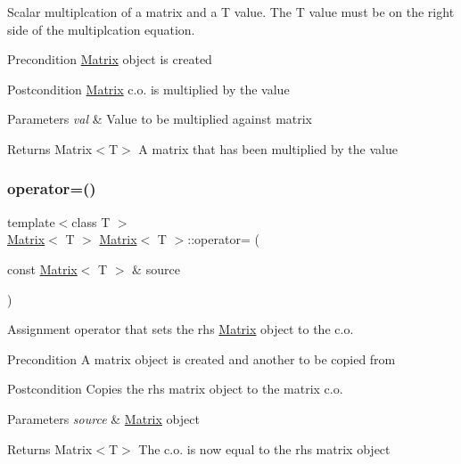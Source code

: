 Scalar multiplcation of a matrix and a T value. The T value must be on the right side of the multiplcation equation. 

\begin{DoxyPrecond}{Precondition}
\mbox{\hyperlink{class_matrix}{Matrix}} object is created 
\end{DoxyPrecond}
\begin{DoxyPostcond}{Postcondition}
\mbox{\hyperlink{class_matrix}{Matrix}} c.\+o. is multiplied by the value 
\end{DoxyPostcond}

\begin{DoxyParams}{Parameters}
{\em val} & Value to be multiplied against matrix \\
\hline
\end{DoxyParams}
\begin{DoxyReturn}{Returns}
Matrix$<$\+T$>$ A matrix that has been multiplied by the value 
\end{DoxyReturn}
\mbox{\label{class_matrix_af8f0ab35b4c32f89c19f12f7e4b7d125}} 
\subsubsection{\texorpdfstring{operator=()}{operator=()}}
{\footnotesize\ttfamily template$<$class T $>$ \\
\mbox{\hyperlink{class_matrix}{Matrix}}$<$ T $>$ \mbox{\hyperlink{class_matrix}{Matrix}}$<$ T $>$\+::operator= (\begin{DoxyParamCaption}\item[{const \mbox{\hyperlink{class_matrix}{Matrix}}$<$ T $>$ \&}]{source }\end{DoxyParamCaption})}



Assignment operator that sets the rhs \mbox{\hyperlink{class_matrix}{Matrix}} object to the c.\+o. 

\begin{DoxyPrecond}{Precondition}
A matrix object is created and another to be copied from 
\end{DoxyPrecond}
\begin{DoxyPostcond}{Postcondition}
Copies the rhs matrix object to the matrix c.\+o. 
\end{DoxyPostcond}

\begin{DoxyParams}{Parameters}
{\em source} & \mbox{\hyperlink{class_matrix}{Matrix}} object \\
\hline
\end{DoxyParams}
\begin{DoxyReturn}{Returns}
Matrix$<$\+T$>$ The c.\+o. is now equal to the rhs matrix object 
\end{DoxyReturn}
\mbox{\label{class_matrix_aa9532c87a69bef256954e2309ca3fdd6}} 
